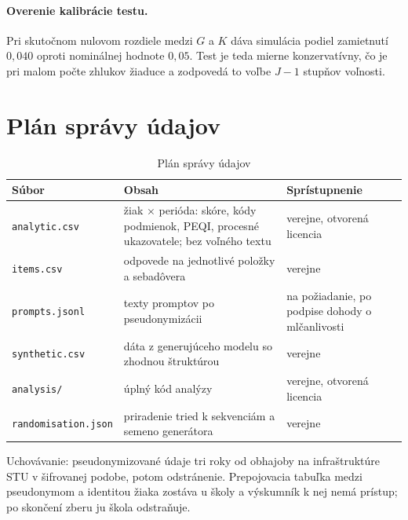\paragraph{Overenie kalibrácie testu.} Pri skutočnom nulovom rozdiele medzi $G$ a $K$ dáva simulácia podiel zamietnutí $0{,}040$ oproti nominálnej hodnote $0{,}05$. Test je teda mierne konzervatívny, čo je pri malom počte zhlukov žiaduce a zodpovedá to voľbe $J-1$ stupňov voľnosti.

\section{Plán správy údajov}

\begin{table}[H]
\centering
\caption{Plán správy údajov}
\label{tab:data-plan}
\small
\begin{tabularx}{\textwidth}{@{}l X X@{}}
\toprule
\textbf{Súbor} & \textbf{Obsah} & \textbf{Sprístupnenie} \\
\midrule
\texttt{analytic.csv} & žiak $\times$ perióda: skóre, kódy podmienok, PEQI, procesné ukazovatele; bez voľného textu & verejne, otvorená licencia \\
\texttt{items.csv} & odpovede na jednotlivé položky a sebadôvera & verejne \\
\texttt{prompts.jsonl} & texty promptov po pseudonymizácii & na požiadanie, po podpise dohody o mlčanlivosti \\
\texttt{synthetic.csv} & dáta z generujúceho modelu so zhodnou štruktúrou & verejne \\
\texttt{analysis/} & úplný kód analýzy & verejne, otvorená licencia \\
\texttt{randomisation.json} & priradenie tried k sekvenciám a semeno generátora & verejne \\
\bottomrule
\end{tabularx}
\end{table}

Uchovávanie: pseudonymizované údaje tri roky od obhajoby na infraštruktúre STU v šifrovanej podobe, potom odstránenie. Prepojovacia tabuľka medzi pseudonymom a identitou žiaka zostáva u školy a výskumník k nej nemá prístup; po skončení zberu ju škola odstraňuje.
